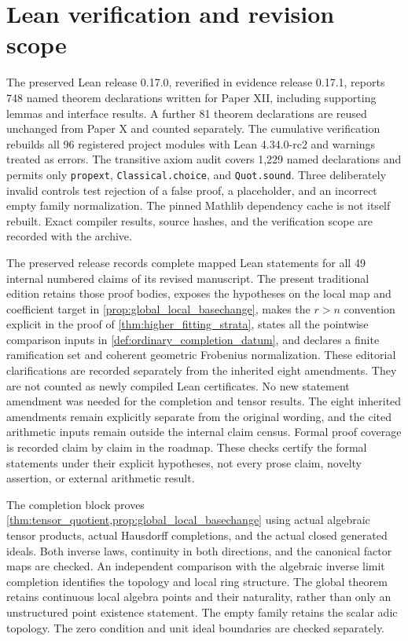 \documentclass[11pt]{amsart}
\theoremstyle{definition}
\theoremstyle{remark}
\begin{document}
\section*{Lean verification and revision scope}

The preserved Lean release 0.17.0, reverified in evidence release 0.17.1, reports 748 named theorem declarations written for Paper XII, including supporting lemmas and interface results. A further 81 theorem declarations are reused unchanged from Paper X and counted separately. The cumulative verification rebuilds all 96 registered project modules with Lean 4.34.0-rc2 and warnings treated as errors. The transitive axiom audit covers 1,229 named declarations and permits only \texttt{propext}, \texttt{Classical.choice}, and \texttt{Quot.sound}. Three deliberately invalid controls test rejection of a false proof, a placeholder, and an incorrect empty family normalization. The pinned Mathlib dependency cache is not itself rebuilt. Exact compiler results, source hashes, and the verification scope are recorded with the archive.

The preserved release records complete mapped Lean statements for all 49 internal numbered claims of its revised manuscript. The present traditional edition retains those proof bodies, exposes the hypotheses on the local map and coefficient target in \cref{prop:global_local_basechange}, makes the \(r>n\) convention explicit in the proof of \cref{thm:higher_fitting_strata}, states all the pointwise comparison inputs in \cref{def:ordinary_completion_datum}, and declares a finite ramification set and coherent geometric Frobenius normalization. These editorial clarifications are recorded separately from the inherited eight amendments. They are not counted as newly compiled Lean certificates. No new statement amendment was needed for the completion and tensor results. The eight inherited amendments remain explicitly separate from the original wording, and the cited arithmetic inputs remain outside the internal claim census. Formal proof coverage is recorded claim by claim in the roadmap. These checks certify the formal statements under their explicit hypotheses, not every prose claim, novelty assertion, or external arithmetic result.

The completion block proves \cref{thm:tensor_quotient,prop:global_local_basechange} using actual algebraic tensor products, actual Hausdorff completions, and the actual closed generated ideals. Both inverse laws, continuity in both directions, and the canonical factor maps are checked. An independent comparison with the algebraic inverse limit completion identifies the topology and local ring structure. The global theorem retains continuous local algebra points and their naturality, rather than only an unstructured point existence statement. The empty family retains the scalar adic topology. The zero condition and unit ideal boundaries are checked separately.
\end{document}

